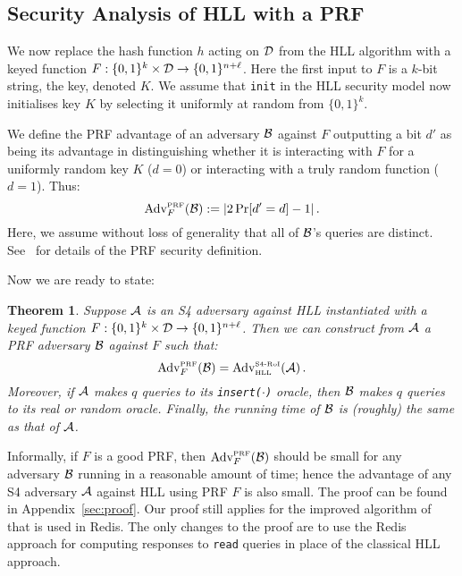 \documentclass{article}
\newtheorem{theorem}{Theorem}
\begin{document}
\subsection{Security Analysis of HLL with a PRF}

We now replace the hash function $h$ acting on ${\cal D}$ from the HLL algorithm with a keyed function $F: \{0,1\}^k \times {\cal D} \rightarrow  \{0,1\}^{n+\ell}$. Here the first input to $F$ is a $k$-bit string, the key, denoted $K$. We assume that \texttt{init} in the HLL security model now initialises key $K$ by selecting it uniformly at random from $\{0,1\}^k$.

We define the PRF advantage of an adversary ${\cal B}$ against $F$ outputting a bit $d'$ as being its advantage in distinguishing whether it is interacting with $F$ for a uniformly random key $K$ ($d=0$) or interacting with a truly random function ($d=1$). Thus: 
\[
\mbox{Adv}^{\mbox{\tiny PRF}}_{F}({\cal B}) := \lvert 2\Pr[d' = d] - 1 \rvert\,.
\]
Here, we assume without loss of generality that all of ${\cal B}$'s queries are distinct. See~\cite[Section 4.4.1]{BonehShoup} for details of the PRF security definition.

Now we are ready to state:

\begin{theorem}\label{thm:security-of-HLL-with-PRF}
Suppose ${\cal A}$ is an S4 adversary against HLL instantiated with a keyed function $F: \{0,1\}^k \times {\cal D} \rightarrow  \{0,1\}^{n+\ell}$. Then we can construct from ${\cal A}$ a PRF adversary ${\cal B}$ against $F$ such that:
\[
 \mbox{Adv}^{\mbox{\tiny PRF}}_{F}({\cal B}) = \mbox{Adv}^{\mbox{\tiny S4-RoI}}_{\mbox{\tiny HLL}}({\cal A}) \,.
\]
Moreover, if ${\cal A}$ makes $q$ queries to its \texttt{insert($\cdot$)} oracle, then ${\cal B}$ makes $q$ queries to its real or random oracle. Finally, the running time of ${\cal B}$ is (roughly) the same as that of ${\cal A}$.
\end{theorem}

Informally, if $F$ is a good PRF, then $\mbox{Adv}^{\mbox{\tiny PRF}}_{F}({\cal B})$ should be small for any adversary ${\cal B}$ running in a reasonable amount of time; hence the advantage of any S4 adversary  ${\cal A}$ against HLL using PRF $F$ is also small. The proof can be found in Appendix~\ref{sec:proof}. Our proof still applies for the improved algorithm of~\cite{hllnew} that is used in Redis. The only changes to the proof are to use the Redis approach for computing responses to \texttt{read} queries in place of the classical HLL approach.
\end{document}
